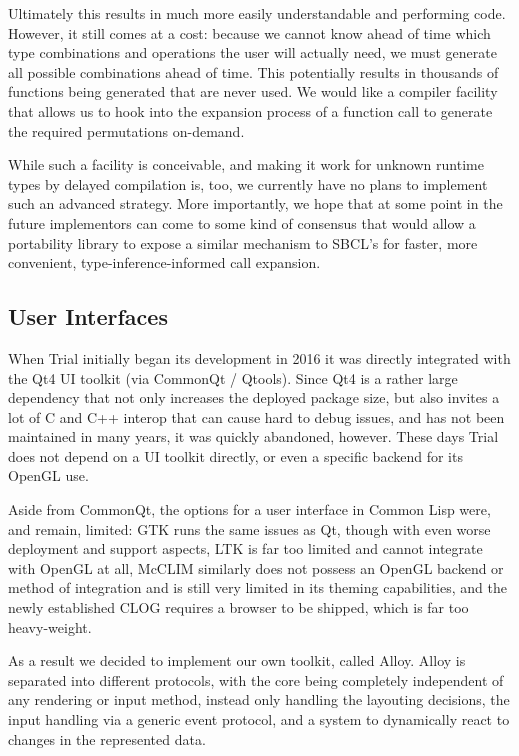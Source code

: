 \documentclass[format=sigconf]{acmart}
\begin{document}
Ultimately this results in much more easily understandable and performing code. However, it still comes at a cost: because we cannot know ahead of time which type combinations and operations the user will actually need, we must generate all possible combinations ahead of time. This potentially results in thousands of functions being generated that are never used. We would like a compiler facility that allows us to hook into the expansion process of a function call to generate the required permutations on-demand.

While such a facility is conceivable, and making it work for unknown runtime types by delayed compilation is, too, we currently have no plans to implement such an advanced strategy. More importantly, we hope that at some point in the future implementors can come to some kind of consensus that would allow a portability library to expose a similar mechanism to SBCL's  for faster, more convenient, type-inference-informed call expansion.

\subsection{User Interfaces}\label{ui}
When Trial initially began its development in 2016 it was directly integrated with the Qt4 UI toolkit (via CommonQt / Qtools). Since Qt4 is a rather large dependency that not only increases the deployed package size, but also invites a lot of C and C++ interop that can cause hard to debug issues, and has not been maintained in many years, it was quickly abandoned, however. These days Trial does not depend on a UI toolkit directly, or even a specific backend for its OpenGL use.

Aside from CommonQt, the options for a user interface in Common Lisp were, and remain, limited: GTK runs the same issues as Qt, though with even worse deployment and support aspects, LTK is far too limited and cannot integrate with OpenGL at all, McCLIM similarly does not possess an OpenGL backend or method of integration and is still very limited in its theming capabilities, and the newly established CLOG requires a browser to be shipped, which is far too heavy-weight.

As a result we decided to implement our own toolkit, called Alloy. Alloy is separated into different protocols, with the core being completely independent of any rendering or input method, instead only handling the layouting decisions, the input handling via a generic event protocol, and a system to dynamically react to changes in the represented data.
\end{document}
